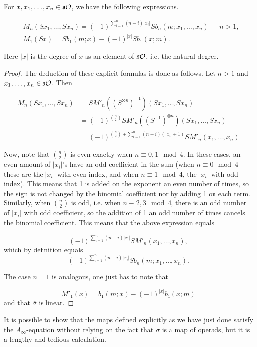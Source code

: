 \documentclass[Thesis.tex]{subfiles}
\begin{document}
\begin{lem}\label{explicit}
For $x,x_1,\dots,x_n\in\mathfrak{s}{\mathcal O}$, we have the following expressions.

\begin{align*}
&M_n(Sx_1,\dots, Sx_n)=(-1)^{\sum_{i=1}^n(n-i)|x_i|}Sb_n(m;x_1,\dots, x_n) & & n>1,\\
&M_1(Sx)=Sb_1(m;x)-(-1)^{|x|}Sb_1(x;m).
\end{align*}

Here $|x|$ is the degree of $x$ as an element of $\mathfrak{s}{\mathcal O}$, i.e. the natural degree. 
\end{lem}
\begin{proof}
The deduction of these explicit formulas is done as follows. Let $n>1$ and $x_1,\dots, x_n\in \mathfrak{s}{\mathcal O}$. Then

\begin{align*}
M_n(Sx_1,\dots, Sx_n)&=SM'_n((S^{\otimes n})^{-1})(Sx_1,\dots, Sx_n)\\
&=(-1)^{\binom{n}{2}}SM'_n((S^{-1})^{\otimes n})(Sx_1,\dots, Sx_n)\\
&=(-1)^{\binom{n}{2}+\sum_{i=1}^n(n-i)(|x_i|+1)}SM'_n(x_1,\dots,x_n)
\end{align*}

Now, note that $\binom{n}{2}$ is even exactly when $n\equiv 0,1\mod 4$. In these cases, an even amount of $|x_i|$'s have an odd coefficient in the sum (when $n\equiv 0\mod 4$ these are the $|x_i|$ with even index, and when $n\equiv 1\mod 4$, the $|x_i|$ with odd index). This means that 1 is added on the exponent an even number of times, so the sign is not changed by the binomial coefficient nor by adding 1 on each term. Similarly, when $\binom{n}{2}$ is odd, i.e. when $n\equiv 2,3\mod 4$, there is an odd number of $|x_i|$ with odd coefficient, so the addition of 1 an odd number of times cancels the binomial coefficient. This means that the above expression equals

\[(-1)^{\sum_{i=1}^n(n-i)|x_i|}SM'_n(x_1,\dots,x_n),\]
which by definition equals
\[(-1)^{\sum_{i=1}^n(n-i)|x_i|}Sb_n(m;x_1,\dots,x_n).\]

The case $n=1$ is analogous, one just has to note that 

\[
M'_1(x)=b_1(m;x)-(-1)^{|x|}b_1(x;m)
\]
and that $\overline{\sigma}$ is linear. 
\end{proof}

It is possible to show that the maps defined explicitly as we have just done satisfy the $A_\infty$-equation without relying on the fact that $\overline{\sigma}$ is a map of operads, but it is a lengthy and tedious calculation.
\end{document}

